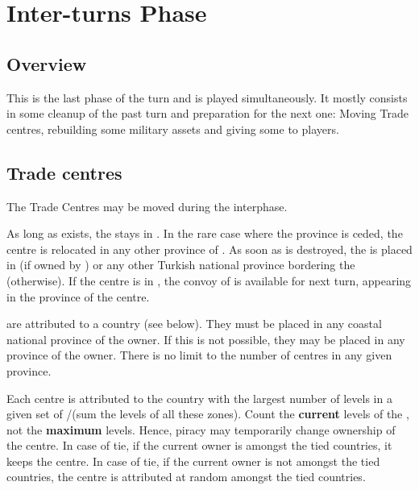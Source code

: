 \chapter{Inter-turns Phase}\label{chapter:Inter}


\section{Overview}
\aparag This is the last phase of the turn and is played
simultaneously. It mostly consists in some cleanup of the past turn and
preparation for the next one: Moving Trade centres, rebuilding some
military assets and giving some \VPs to players.

\aparag[Sequence.]
\InterDetails

\section{Trade centres}\label{chInter:Trade Centres}

\aparag The Trade Centres may be moved during the interphase.

 As long as \paysEgypte exists, the 
stays in \provinceNil. In the rare case where the province is ceded, the
centre is relocated in any other province of \paysEgypte.
\bparag As soon as \paysEgypte is destroyed, the  is placed
in \provinceIzmir (if owned by \TUR) or any other Turkish national province
bordering the \regionMediterrannee (otherwise).
\bparag If the centre is in \TUR, the convoy of  is available for
next turn, appearing in the province of the centre.

 are attributed to a country (see below).
\bparag They must be placed in any coastal national province of the owner.
\bparag If this is not possible, they may be placed in any province of the
owner.
\bparag There is no limit to the number of centres in any given province.

\aparag[Attribution] Each centre is attributed to the country with the largest
number of \TradeFLEET levels in a given set of \STZ/\CTZ (sum the levels of
all these zones).
\bparag Count the \textbf{current} levels of the \TradeFLEET, not the
\textbf{maximum} levels. Hence, piracy may temporarily change ownership of the
centre.
\bparag In case of tie, if the current owner is amongst the tied countries, it
keeps the centre.
\bparag In case of tie, if the current owner is not amongst the tied
countries, the centre is attributed at random amongst the tied countries.

